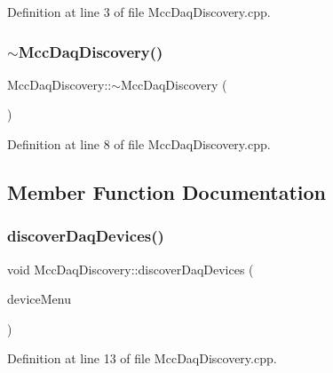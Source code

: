 Definition at line 3 of file Mcc\+Daq\+Discovery.\+cpp.

\mbox{\label{class_mcc_daq_discovery_a4e78c3976aa703110af281b229e4762a}} 
\subsubsection{\texorpdfstring{$\sim$\+Mcc\+Daq\+Discovery()}{~MccDaqDiscovery()}}
{\footnotesize\ttfamily Mcc\+Daq\+Discovery\+::$\sim$\+Mcc\+Daq\+Discovery (\begin{DoxyParamCaption}{ }\end{DoxyParamCaption})}



Definition at line 8 of file Mcc\+Daq\+Discovery.\+cpp.



\subsection{Member Function Documentation}
\mbox{\label{class_mcc_daq_discovery_a9b2541fefb5156e2412f4e3eb34eed72}} 
\subsubsection{\texorpdfstring{discover\+Daq\+Devices()}{discoverDaqDevices()}}
{\footnotesize\ttfamily void Mcc\+Daq\+Discovery\+::discover\+Daq\+Devices (\begin{DoxyParamCaption}\item[{Q\+Menu $\ast$}]{device\+Menu }\end{DoxyParamCaption})}



Definition at line 13 of file Mcc\+Daq\+Discovery.\+cpp.

